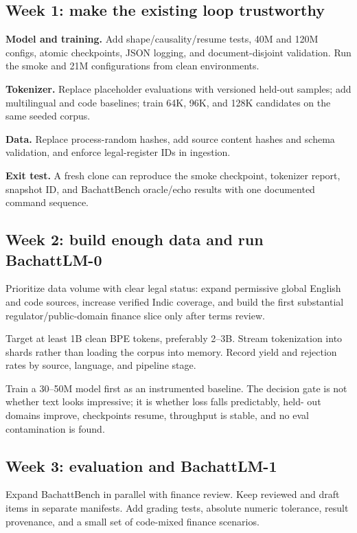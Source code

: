 \subsection{Week 1: make the existing loop trustworthy}

\textbf{Model and training.} Add shape/causality/resume tests, 40M and 120M
configs, atomic checkpoints, JSON logging, and document-disjoint validation.
Run the smoke and 21M configurations from clean environments.

\textbf{Tokenizer.} Replace placeholder evaluations with versioned held-out
samples; add multilingual and code baselines; train 64K, 96K, and 128K
candidates on the same seeded corpus.

\textbf{Data.} Replace process-random hashes, add source content hashes and
schema validation, and enforce legal-register IDs in ingestion.

\textbf{Exit test.} A fresh clone can reproduce the smoke checkpoint, tokenizer
report, snapshot ID, and BachattBench oracle/echo results with one documented
command sequence.

\subsection{Week 2: build enough data and run BachattLM-0}

Prioritize data volume with clear legal status: expand permissive global
English and code sources, increase verified Indic coverage, and build the first
substantial regulator/public-domain finance slice only after terms review.

Target at least 1B clean BPE tokens, preferably 2--3B. Stream tokenization into
shards rather than loading the corpus into memory. Record yield and rejection
rates by source, language, and pipeline stage.

Train a 30--50M model first as an instrumented baseline. The decision gate is
not whether text looks impressive; it is whether loss falls predictably, held-
out domains improve, checkpoints resume, throughput is stable, and no eval
contamination is found.

\subsection{Week 3: evaluation and BachattLM-1}

Expand BachattBench in parallel with finance review. Keep reviewed and draft
items in separate manifests. Add grading tests, absolute numeric tolerance,
result provenance, and a small set of code-mixed finance scenarios.

